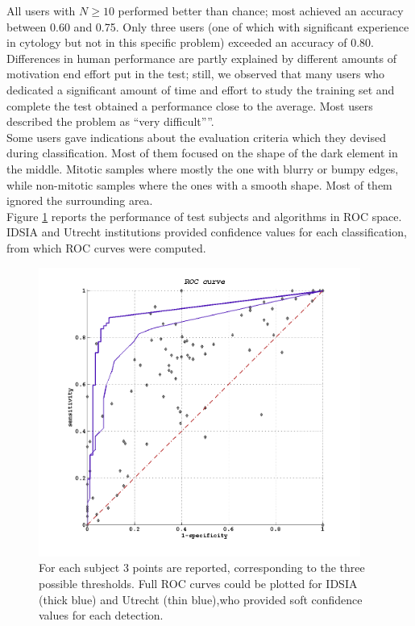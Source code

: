 All users with $N \geq 10$ performed better than chance; most achieved an
accuracy between 0.60 and 0.75. Only three users (one of which with significant experience in cytology but not in this specific problem)
exceeded an accuracy of 0.80. Differences in human performance are partly explained by different
amounts of motivation end effort put in the test; still, we observed that many
users who dedicated a significant amount of time and effort to study the training set and complete the test obtained a performance close to the average.
Most users described the problem as \textquotedblleft{}very difficult\textquotedblright”.\\
Some users gave indications about the evaluation criteria which they devised during classification. Most of them focused on the shape of the dark element in the middle.
Mitotic samples where mostly the one with blurry or bumpy edges, while non-mitotic samples where the ones with a smooth shape.
Most of them ignored the surrounding area.\\
Figure \ref{ch6:fig22} reports the performance of test subjects and algorithms in \Gls{ROC} space. IDSIA and Utrecht institutions provided confidence values for each classification,
from which \Gls{ROC} curves were computed.

\begin{figure}[!htb]
   \begin{center}
    \includegraphics[width=0.94\textwidth]{./images/human/p2.png}
    \caption[ROC plot humans vs. algorithms]{For each subject 3 points are reported, corresponding to the three possible thresholds.
    Full ROC curves could be plotted for IDSIA (thick blue) and Utrecht (thin blue),who provided soft confidence values for each detection.}
    \label{ch6:fig22}
    \end{center}
\end{figure}

